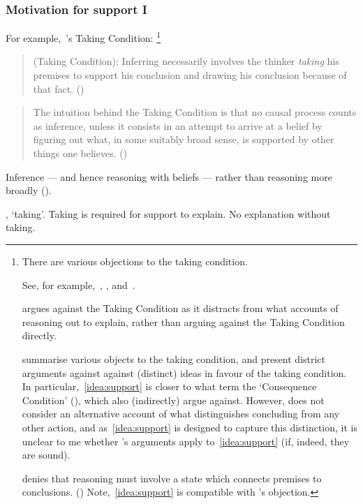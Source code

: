 \subsubsection{Motivation for support I}

\begin{note}
  For example,~\citeauthor{Boghossian:2014aa}'s Taking Condition:%
  \footnote{
    There are various objections to the taking condition.

    See, for example,~\textcite{Hlobil:2014tq}, \textcite{McHugh:2016vp}, and~\textcite{Wright:2014tt}.

    \citeauthor{Hlobil:2014tq} argues against the Taking Condition as it distracts from what accounts of reasoning out to explain, rather than arguing against the Taking Condition directly.

    \citeauthor{McHugh:2016vp} summarise various objects to the taking condition, and present district arguments against against (distinct) ideas in favour of the taking condition.
    In particular,~\autoref{idea:support} is closer to what \citeauthor{McHugh:2016vp} term the `Consequence Condition' (\citeyear[cf.][316]{McHugh:2016vp}), which \citeauthor{McHugh:2016vp} also (indirectly) argue against.
    However, \citeauthor{McHugh:2016vp} does not consider an alternative account of what distinguishes concluding from any other action, and as~\autoref{idea:support} is designed to capture this distinction, it is unclear to me whether \citeauthor{McHugh:2016vp}'s arguments apply to~\autoref{idea:support} (if, indeed, they are sound).

    \citeauthor{Wright:2014tt} denies that reasoning must involve a state which connects premises to conclusions. (\citeyear[Cf.][33-34]{Wright:2014tt})
    Note,~\autoref{idea:support} is compatible with \citeauthor{Wright:2014tt}'s objection.
  }

  \begin{quote}
    (Taking Condition):
    Inferring necessarily involves the thinker \emph{taking} his premises to support his conclusion and drawing his conclusion because of that fact.%
    \mbox{}\hfill\mbox{(\citeyear[5]{Boghossian:2014aa})}
  \end{quote}

  \begin{quote}
    The intuition behind the Taking Condition is that no causal process counts as inference, unless it consists in an attempt to arrive at a belief by figuring out what, in some suitably broad sense, is supported by other things one believes.%
    \mbox{}\hfill\mbox{(\citeyear[5]{Boghossian:2014aa})}
  \end{quote}

  Inference --- and hence reasoning with beliefs --- rather than reasoning more broadly (\citeyear[cf][2]{Boghossian:2014aa}).

  \citeauthor{Boghossian:2014aa}, `taking'.
  Taking is required for support to explain.
  No explanation without taking.
\end{note}


